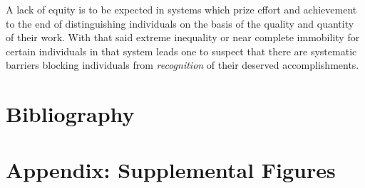 \documentclass{article}
\begin{document}
A lack of equity is to be expected in systems which prize effort and achievement to the end of distinguishing individuals on the basis of the quality and quantity of their work. With that said extreme inequality or near complete immobility for certain individuals in that system leads one to suspect that there are systematic barriers blocking individuals from \emph{recognition} of their deserved accomplishments.


\section{Bibliography}



\section{Appendix: Supplemental Figures}
\end{document}
